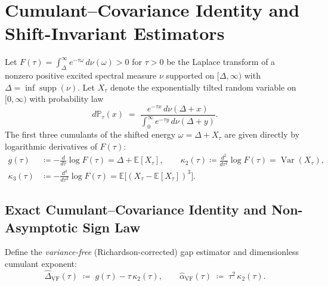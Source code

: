 \documentclass[11pt,a4paper]{article}
\theoremstyle{definition}
\newcommand{\E}{\mathbb{E}}
\newcommand{\Var}{\operatorname{Var}}
\begin{document}
\section{Cumulant--Covariance Identity and Shift-Invariant Estimators}
\label{sec:cumulants}

Let $F(\tau) = \int_\Delta^\infty e^{-\tau \omega}\, d\nu(\omega) > 0$ for $\tau > 0$ be the Laplace transform of a nonzero positive excited spectral measure $\nu$ supported on $[\Delta, \infty)$ with $\Delta = \inf \operatorname{supp}(\nu)$. Let $X_\tau$ denote the exponentially tilted random variable on $[0, \infty)$ with probability law
\[
  d\mathbb{P}_\tau(x) \;=\; \frac{e^{-\tau x}\, d\nu(\Delta + x)}{\int_0^\infty e^{-\tau y}\, d\nu(\Delta + y)}.
\]
The first three cumulants of the shifted energy $\omega = \Delta + X_\tau$ are given directly by logarithmic derivatives of $F(\tau)$:
\begin{align}
  g(\tau) &\coloneqq -\frac{d}{d\tau}\log F(\tau) = \Delta + \E[X_\tau], \qquad
  \kappa_2(\tau) \coloneqq \frac{d^2}{d\tau^2}\log F(\tau) = \Var(X_\tau), \nonumber\\
  \kappa_3(\tau) &\coloneqq -\frac{d^3}{d\tau^3}\log F(\tau) = \E\bigl[(X_\tau - \E[X_\tau])^3\bigr].
  \label{eq:cumulants}
\end{align}

\subsection{Exact Cumulant--Covariance Identity and Non-Asymptotic Sign Law}

Define the \emph{variance-free} (Richardson-corrected) gap estimator and dimensionless cumulant exponent:
\begin{equation}
  \widehat{\Delta}_{\mathrm{VF}}(\tau) \;\coloneqq\; g(\tau) - \tau\,\kappa_2(\tau), \qquad
  \widehat{\alpha}_{\mathrm{VF}}(\tau) \;\coloneqq\; \tau^2\,\kappa_2(\tau).
  \label{eq:vf_def}
\end{equation}
\end{document}
